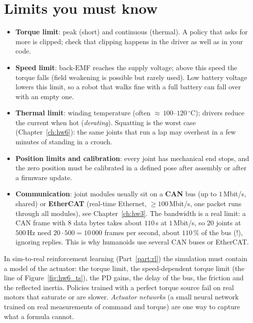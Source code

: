 \section*{Limits you must know}
\begin{itemize}[nosep]
\item \textbf{Torque limit}: peak (short) and continuous (thermal). A policy that asks for more is clipped; check that clipping happens in the driver as well as in your code.
\item \textbf{Speed limit}: back-EMF reaches the supply voltage; above this speed the torque falls (field weakening is possible but rarely used). Low battery voltage lowers this limit, so a robot that walks fine with a full battery can fall over with an empty one.
\item \textbf{Thermal limit}: winding temperature (often $\approx$\,$100$--$120\,^\circ$C); drivers reduce the current when hot (\emph{derating}). Squatting is the worst case (Chapter~\ref{ch:hw6}): the same joints that run a lap may overheat in a few minutes of standing in a crouch.
\item \textbf{Position limits and calibration}: every joint has mechanical end stops, and the zero position must be calibrated in a defined pose after assembly or after a firmware update.
\item \textbf{Communication}: joint modules usually sit on a \textbf{CAN} bus (up to $1$\,Mbit/s, shared) or \textbf{EtherCAT} (real-time Ethernet, $\ge100$\,Mbit/s, one packet runs through all modules), see Chapter~\ref{ch:hw3}. The bandwidth is a real limit: a CAN frame with $8$ data bytes takes about $110$\,\textmu s at $1$\,Mbit/s, so $20$ joints at $500$\,Hz need $20\cdot500=10\,000$ frames per second, about $110\,\%$ of the bus (!), ignoring replies. This is why humanoids use several CAN buses or EtherCAT.
\end{itemize}

\begin{aibox}
In sim-to-real reinforcement learning (Part~\ref{part:rl}) the simulation must contain a model of the actuator: the torque limit, the speed-dependent torque limit (the line of Figure~\ref{fig:hw6_ts}), the PD gains, the delay of the bus, the friction and the reflected inertia. Policies trained with a perfect torque source fail on real motors that saturate or are slower. \emph{Actuator networks} (a small neural network trained on real measurements of command and torque) are one way to capture what a formula cannot.
\end{aibox}


